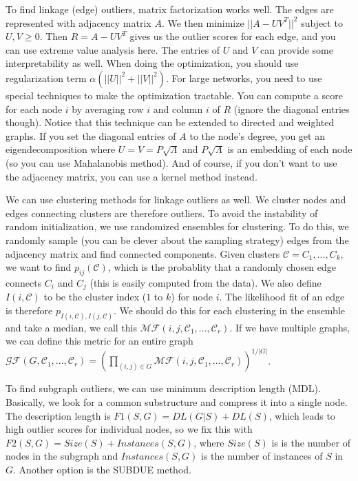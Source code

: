 \documentclass[a4paper]{article}
\begin{document}
To find linkage (edge) outliers, matrix factorization works well. The edges are
represented with adjacency matrix $A$. We then minimize $||A - UV^T||^2$
subject to $U, V \geq 0$. Then $R = A - UV^T$ gives us the outlier scores for each
edge, and you can use extreme value analysis here. The entries of $U$ and $V$
can provide some interpretability as well. When doing the optimization, you
should use regularization term $\alpha(||U||^2 + ||V||^2)$. For large networks,
you need to use special techniques to make the optimization tractable. You can
compute a score for each node $i$ by averaging row $i$ and column $i$ of $R$
(ignore the diagonal entries though). Notice that this technique can be extended
to directed and weighted graphs. If you set the diagonal entries of $A$ to
the node's degree, you get an eigendecomposition where $U = V = P\sqrt{\Lambda}$
and $P\sqrt{\Lambda}$ is an embedding of each node (so you can use Mahalanobis
method). And of course, if you don't want to use the adjacency matrix, you can
use a kernel method instead.

We can use clustering methods for linkage outliers as well. We cluster nodes and
edges connecting clusters are therefore outliers. To avoid the instability of
random initialization, we use randomized ensembles for clustering. To do this,
we randomly sample (you can be clever about the sampling strategy) edges from the
adjacency matrix and find connected components. Given clusters $\mathcal{C} =
C_1, ..., C_k$, we want to find $p_{ij}(\mathcal{C})$, which is the probablity
that a randomly chosen edge connects $C_i$ and $C_j$ (this is easily computed
from the data). We also define $I(i, \mathcal{C})$ to be the cluster index ($1$
to $k$) for node $i$. The likelihood fit of an edge is therefore $p_{I(i,
\mathcal{C}),I(j, \mathcal{C})}$. We should do this for each clustering in the
ensemble and take a median, we call this $\mathcal{MF}(i, j, \mathcal{C}_1,
..., \mathcal{C}_r)$. If we have multiple graphs, we can define this metric for
an entire graph $\mathcal{GF}(G, \mathcal{C}_1, ..., \mathcal{C}_r) = (
\prod_{(i, j) \in G}{\mathcal{MF}(i, j, \mathcal{C}_1, ..., \mathcal{C}_r)})^
{1/|G|}$.

To find subgraph outliers, we can use minimum description length (MDL).
Basically, we look for a common substructure and compress it into a single node.
The description length is $F1(S, G) = DL(G|S) + DL(S)$, which leads to high
outlier scores for individual nodes, so we fix this with $F2(S, G) = Size(S)
+ Instances(S, G)$, where $Size(S)$ is is the number of nodes in the subgraph
and $Instances(S, G)$ is the number of instances of $S$ in $G$. Another option
is the SUBDUE method.
\end{document}
